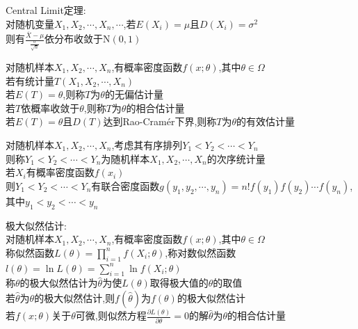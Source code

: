 \begin{dingli}
Central Limit定理:\\
对随机变量$X_1,X_2,\cdots,X_n,\cdots$,若$E(X_i)=\mu$且$D(X_i)=\sigma^2$\\
则有$\frac{\overline{X}-\mu}{\frac{\sigma}{\sqrt{n}}}$依分布收敛于N$(0,1)$
\end{dingli}

\begin{dingyi}
对随机样本$X_1,X_2,\cdots,X_n$,有概率密度函数$f(x;\theta)$,其中$\theta\in\Omega$\\
若有统计量$T(X_1,X_2,\cdots,X_n)$\\
若$E(T)=\theta$,则称$T$为$\theta$的无偏估计量\\
若$T$依概率收敛于$\theta$,则称$T$为$\theta$的相合估计量\\
若$E(T)=\theta$且$D(T)$达到Rao-Cramér下界,则称$T$为$\theta$的有效估计量
\end{dingyi}

\begin{dingyi}
对随机样本$X_1,X_2,\cdots,X_n$,考虑其有序排列$Y_1<Y_2<\cdots<Y_n$\\
则称$Y_1<Y_2<\cdots<Y_n$为随机样本$X_1,X_2,\cdots,X_n$的次序统计量\\
若$X_i$有概率密度函数$f(x_i)$\\
则$Y_1<Y_2<\cdots<Y_n$有联合密度函数$g(y_1,y_2,\cdots,y_n)=n!f(y_1)f(y_2)\cdots f(y_n)$,其中$y_1<y_2<\cdots<y_n$
\end{dingyi}

\begin{dingyi}
极大似然估计:\\
对随机样本$X_1,X_2,\cdots,X_n$,有概率密度函数$f(x;\theta)$,其中$\theta\in\Omega$\\
称似然函数$L(\theta)=\prod\limits_{i=1}^{n}f(X_i;\theta)$,称对数似然函数$l(\theta)=\ln L(\theta)=\sum\limits_{i=1}^{n}\ln f(X_i;\theta)$\\
称$\theta$的极大似然估计为$\hat{\theta}$为使$L(\theta)$取得极大值的$\theta$的取值\\
若$\hat{\theta}$为$\theta$的极大似然估计,则$f(\hat{\theta})$为$f(\theta)$的极大似然估计\\
若$f(x;\theta)$关于$\theta$可微,则似然方程$\frac{\partial L(\theta)}{\partial \theta}=0$的解$\hat{\theta}$为$\theta$的相合估计量
\end{dingyi}


